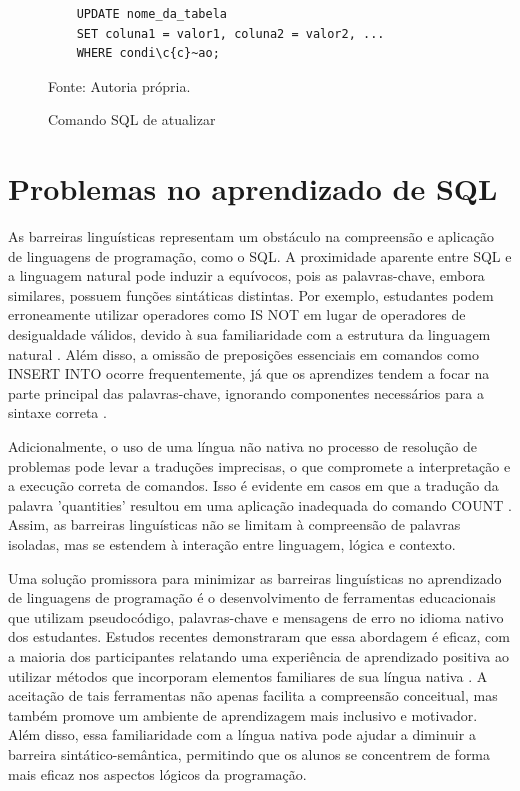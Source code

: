 \begin{figure}[H]
    \centering
    \begin{lstlisting}
    UPDATE nome_da_tabela
    SET coluna1 = valor1, coluna2 = valor2, ...
    WHERE condi\c{c}~ao;
    \end{lstlisting}
    \caption{Comando SQL de atualizar}
    Fonte: Autoria própria.
    \label{lst:delete}
\end{figure}

\section{Problemas no aprendizado de SQL}

As barreiras linguísticas representam um obstáculo na compreensão e aplicação de linguagens de programação, como o SQL. A proximidade aparente entre SQL e a linguagem natural pode induzir a equívocos, pois as palavras-chave, embora similares, possuem funções sintáticas distintas. Por exemplo, estudantes podem erroneamente utilizar operadores como IS NOT em lugar de operadores de desigualdade válidos, devido à sua familiaridade com a estrutura da linguagem natural \cite{Miedema2021}. Além disso, a omissão de preposições essenciais em comandos como INSERT INTO ocorre frequentemente, já que os aprendizes tendem a focar na parte principal das palavras-chave, ignorando componentes necessários para a sintaxe correta \cite{Miedema2021}.

Adicionalmente, o uso de uma língua não nativa no processo de resolução de problemas pode levar a traduções imprecisas, o que compromete a interpretação e a execução correta de comandos. Isso é evidente em casos em que a tradução da palavra 'quantities' resultou em uma aplicação inadequada do comando COUNT \cite{Miedema2021}. Assim, as barreiras linguísticas não se limitam à compreensão de palavras isoladas, mas se estendem à interação entre linguagem, lógica e contexto.

Uma solução promissora para minimizar as barreiras linguísticas no aprendizado de linguagens de programação é o desenvolvimento de ferramentas educacionais que utilizam pseudocódigo, palavras-chave e mensagens de erro no idioma nativo dos estudantes. Estudos recentes demonstraram que essa abordagem é eficaz, com a maioria dos participantes relatando uma experiência de aprendizado positiva ao utilizar métodos que incorporam elementos familiares de sua língua nativa \cite{Silva2020}. A aceitação de tais ferramentas não apenas facilita a compreensão conceitual, mas também promove um ambiente de aprendizagem mais inclusivo e motivador. Além disso, essa familiaridade com a língua nativa pode ajudar a diminuir a barreira sintático-semântica, permitindo que os alunos se concentrem de forma mais eficaz nos aspectos lógicos da programação.

